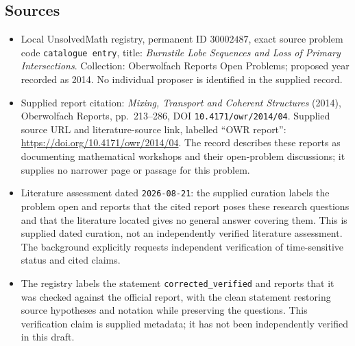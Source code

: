 \documentclass[11pt]{article}
\begin{document}
\subsection{Sources}
\begin{itemize}
\item Local UnsolvedMath registry, permanent ID \(30002487\), exact source problem code \texttt{catalogue entry}, title: \emph{Burnstile Lobe Sequences and Loss of Primary Intersections}. Collection: Oberwolfach Reports Open Problems; proposed year recorded as 2014. No individual proposer is identified in the supplied record.
\item Supplied report citation: \emph{Mixing, Transport and Coherent Structures} (2014), Oberwolfach Reports, pp.\ 213--286, DOI \texttt{10.4171/owr/2014/04}. Supplied source URL and literature-source link, labelled ``OWR report'': \url{https://doi.org/10.4171/owr/2014/04}. The record describes these reports as documenting mathematical workshops and their open-problem discussions; it supplies no narrower page or passage for this problem.
\item Literature assessment dated \texttt{2026-08-21}: the supplied curation labels the problem open and reports that the cited report poses these research questions and that the literature located gives no general answer covering them. This is supplied dated curation, not an independently verified literature assessment. The background explicitly requests independent verification of time-sensitive status and cited claims.
\item The registry labels the statement \texttt{corrected\_verified} and reports that it was checked against the official report, with the clean statement restoring source hypotheses and notation while preserving the questions. This verification claim is supplied metadata; it has not been independently verified in this draft.
\end{itemize}
\end{document}

